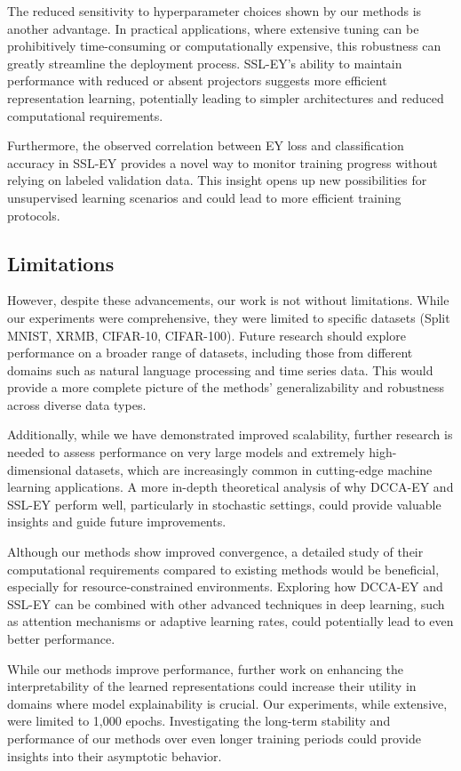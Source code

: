 The reduced sensitivity to hyperparameter choices shown by our methods is another advantage. In practical applications, where extensive tuning can be prohibitively time-consuming or computationally expensive, this robustness can greatly streamline the deployment process. SSL-EY's ability to maintain performance with reduced or absent projectors suggests more efficient representation learning, potentially leading to simpler architectures and reduced computational requirements.

Furthermore, the observed correlation between EY loss and classification accuracy in SSL-EY provides a novel way to monitor training progress without relying on labeled validation data. This insight opens up new possibilities for unsupervised learning scenarios and could lead to more efficient training protocols.

\subsection{Limitations}

However, despite these advancements, our work is not without limitations. While our experiments were comprehensive, they were limited to specific datasets (Split MNIST, XRMB, CIFAR-10, CIFAR-100). Future research should explore performance on a broader range of datasets, including those from different domains such as natural language processing and time series data. This would provide a more complete picture of the methods' generalizability and robustness across diverse data types.

Additionally, while we have demonstrated improved scalability, further research is needed to assess performance on very large models and extremely high-dimensional datasets, which are increasingly common in cutting-edge machine learning applications. A more in-depth theoretical analysis of why DCCA-EY and SSL-EY perform well, particularly in stochastic settings, could provide valuable insights and guide future improvements.

Although our methods show improved convergence, a detailed study of their computational requirements compared to existing methods would be beneficial, especially for resource-constrained environments. Exploring how DCCA-EY and SSL-EY can be combined with other advanced techniques in deep learning, such as attention mechanisms or adaptive learning rates, could potentially lead to even better performance.

While our methods improve performance, further work on enhancing the interpretability of the learned representations could increase their utility in domains where model explainability is crucial. Our experiments, while extensive, were limited to 1,000 epochs. Investigating the long-term stability and performance of our methods over even longer training periods could provide insights into their asymptotic behavior.

